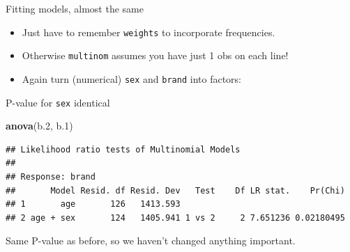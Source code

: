 \documentclass[ignorenonframetext,]{beamer}
\newenvironment{Shaded}{\begin{snugshade}}{\end{snugshade}}
\newcommand{\DataTypeTok}[1]{\textcolor[rgb]{0.13,0.29,0.53}{#1}}
\newcommand{\FloatTok}[1]{\textcolor[rgb]{0.00,0.00,0.81}{#1}}
\newcommand{\KeywordTok}[1]{\textcolor[rgb]{0.13,0.29,0.53}{\textbf{#1}}}
\newcommand{\NormalTok}[1]{#1}
\newcommand{\OperatorTok}[1]{\textcolor[rgb]{0.81,0.36,0.00}{\textbf{#1}}}
\newcommand{\StringTok}[1]{\textcolor[rgb]{0.31,0.60,0.02}{#1}}
\begin{document}
\begin{frame}[fragile]{Fitting models, almost the same}
\protect\hypertarget{fitting-models-almost-the-same}{}

\begin{itemize}
\item
  Just have to remember \texttt{weights} to incorporate frequencies.
\item
  Otherwise \texttt{multinom} assumes you have just 1 obs on each line!
\item
  Again turn (numerical) \texttt{sex} and \texttt{brand} into factors:
\end{itemize}

\footnotesize

\begin{Shaded}
\end{Shaded}

\normalsize

\end{frame}

\begin{frame}[fragile]{P-value for \texttt{sex} identical}
\protect\hypertarget{p-value-for-sex-identical}{}

\footnotesize

\begin{Shaded}
\begin{Highlighting}[]
\KeywordTok{anova}\NormalTok{(b}\FloatTok{.2}\NormalTok{, b}\FloatTok{.1}\NormalTok{)}
\end{Highlighting}
\end{Shaded}

\begin{verbatim}
## Likelihood ratio tests of Multinomial Models
## 
## Response: brand
##       Model Resid. df Resid. Dev   Test    Df LR stat.    Pr(Chi)
## 1       age       126   1413.593                                 
## 2 age + sex       124   1405.941 1 vs 2     2 7.651236 0.02180495
\end{verbatim}

\normalsize

Same P-value as before, so we haven't changed anything important.

\end{frame}
\end{document}
